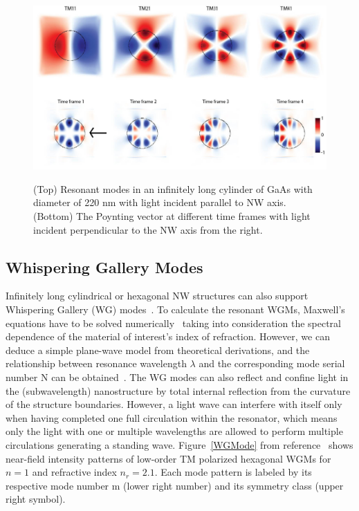 \begin{figure}
  \caption{(Top) Resonant modes in an infinitely long cylinder of GaAs with diameter of 220 nm with light incident parallel to NW axis. (Bottom) The Poynting vector at different time frames with light incident perpendicular to the NW axis from the right.}
  \centering
  \includegraphics[width=\textwidth]{pictures/LM/CylindEz}
  \label{CylindEz}
\end{figure}

\subsection{Whispering Gallery Modes}
\label{sec:WGM}

Infinitely long cylindrical or hexagonal NW structures can also support
Whispering Gallery (WG)
modes~\cite{Zimmler:2008fc,huang2001room,Zhao:2014jt,Nobis:2005wg,Czekalla:2010uw,Gargas:2009cx,Fallert:2008ej,Johnson:2002ua,Nobis:2004tp}.
To calculate the resonant WGMs, Maxwell’s equations have to be solved
numerically~\cite{Wiersig:2003vo} taking into consideration the spectral
dependence of the material of interest’s index of refraction. However, we can
deduce a simple plane-wave model from theoretical derivations, and the
relationship between resonance wavelength $\lambda$ and the corresponding mode
serial number N can be obtained~\cite{Nobis:2004tp}. The WG modes can also
reflect and confine light in the (subwavelength) nanostructure by total
internal reflection from the curvature of the structure boundaries. However, a
light wave can interfere with itself only when having completed one full
circulation within the resonator, which means only the light with one or
multiple wavelengths are allowed to perform multiple circulations generating a
standing wave.  Figure~\ref{WGMode} from reference~\cite{Nobis:2005wg} shows
near-field intensity patterns of low-order TM polarized hexagonal WGMs for $n =
1$ and refractive index $n_r = 2.1$. Each mode pattern is labeled by its
respective mode number m (lower right number) and its symmetry class (upper
right symbol).

